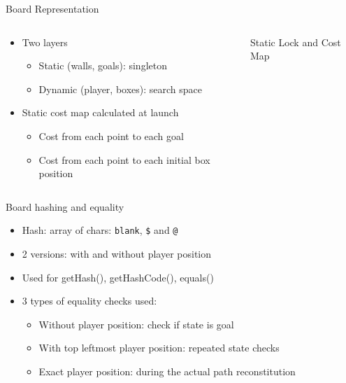 \documentclass{beamer}
\begin{document}
\begin{frame}{Board Representation}
  \begin{columns}
    \begin{column}{.5\textwidth}
      \begin{itemize}
        \item Two layers
        \begin{itemize}
          \item Static (walls, goals): singleton
          \item Dynamic (player, boxes): search space
        \end{itemize}
        \item Static cost map calculated at launch
        \begin{itemize}
          \item Cost from each point to each goal
          \item Cost from each point to each initial box position
        \end{itemize}
      \end{itemize}
    \end{column}
    \begin{column}{.5\textwidth}
      \begin{block}{Static Lock and Cost Map}
        \centering
        \usebox{\mapstatic}
      \end{block}
    \end{column}
  \end{columns}
\end{frame}

\begin{frame}{Board hashing and equality}
  \begin{itemize}
    \item Hash: array of chars: \texttt{blank}, \texttt{\$} and \texttt{@}
    \item 2 versions: with and without player position
    \item Used for getHash(), getHashCode(), equals()
    \item 3 types of equality checks used:
    \begin{itemize}
      \item Without player position: check if state is goal
      \item With top leftmost player position: repeated state checks
      \item Exact player position: during the actual path reconstitution
    \end{itemize}
  \end{itemize}
\end{frame}
\end{document}
